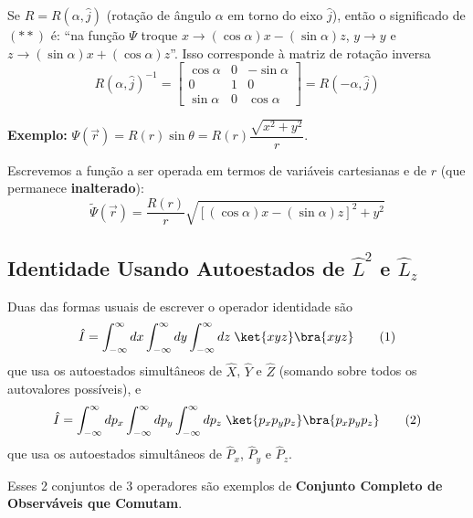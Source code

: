 Se $R = R(\alpha, \hat{j})$ (rotação de ângulo $\alpha$ em torno do eixo $\hat{j}$), então o significado de $(**)$ é: ``na função $\Psi$ troque $x \to (\cos\alpha)x - (\sin\alpha)z$, $y \to y$ e $z \to (\sin\alpha)x + (\cos\alpha)z$''. Isso corresponde à matriz de rotação inversa
\begin{equation}
    R(\alpha, \hat{j})^{-1} =
    \begin{bmatrix}
        \cos\alpha & 0 & -\sin\alpha \\
        0 & 1 & 0 \\
        \sin\alpha & 0 & \cos\alpha
    \end{bmatrix}
    = R(-\alpha, \hat{j})
\label{eq:aula22_matriz_rotacao_inversa}
\end{equation}

\textbf{Exemplo:} $\Psi(\vec{r}) = R(r)\sin\theta = R(r)\dfrac{\sqrt{x^2+y^2}}{r}$.

Escrevemos a função a ser operada em termos de variáveis cartesianas e de $r$ (que permanece \textbf{inalterado}):
\begin{equation}
    \widetilde{\Psi}(\vec{r}) = \frac{R(r)}{r}\sqrt{\left[(\cos\alpha)x - (\sin\alpha)z\right]^2 + y^2}
\label{eq:aula22_exemplo_rot_final}
\end{equation}

\subsection*{Identidade Usando Autoestados de $\hat{L}^2$ e $\hat{L}_z$}

Duas das formas usuais de escrever o operador identidade são
\begin{equation}
    \hat{I} = \int_{-\infty}^{\infty}dx\int_{-\infty}^{\infty}dy\int_{-\infty}^{\infty}dz \; \ket{xyz}\bra{xyz} \tag{1}
\label{eq:aula22_identidade_xyz}
\end{equation}
que usa os autoestados simultâneos de $\hat{X}$, $\hat{Y}$ e $\hat{Z}$ (somando sobre todos os autovalores possíveis), e
\begin{equation}
    \hat{I} = \int_{-\infty}^{\infty}dp_x\int_{-\infty}^{\infty}dp_y\int_{-\infty}^{\infty}dp_z \; \ket{p_xp_yp_z}\bra{p_xp_yp_z} \tag{2}
\label{eq:aula22_identidade_pxpypz}
\end{equation}
que usa os autoestados simultâneos de $\hat{P}_x$, $\hat{P}_y$ e $\hat{P}_z$.

Esses 2 conjuntos de 3 operadores são exemplos de \textbf{Conjunto Completo de Observáveis que Comutam}.

